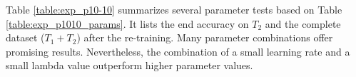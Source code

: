 Table \ref{table:exp_p10-10} summarizes several parameter tests based on Table \ref{table:exp_p1010_params}.
It lists the end accuracy on $T_2$ and the complete dataset ($T_1 + T_2$) after the re-training.
\newline
Many parameter combinations offer promising results.
Nevertheless, the combination of a small learning rate and a small lambda value outperform higher parameter values.
